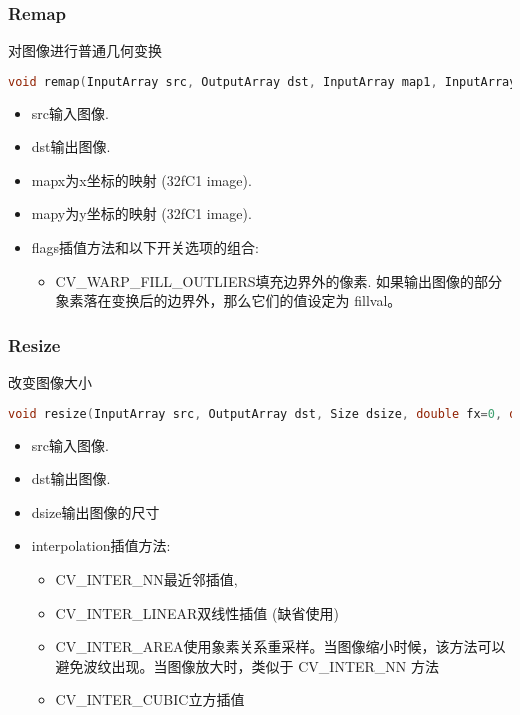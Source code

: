\documentclass[12pt]{article}
\begin{document}
\subsubsection{Remap}
对图像进行普通几何变换
\begin{lstlisting}[language=c++]
void remap(InputArray src, OutputArray dst, InputArray map1, InputArray map2, int interpolation, int borderMode=BORDER_CONSTANT, const Scalar& borderValue=Scalar())
\end{lstlisting}
\begin{itemize}
\item src输入图像. 
\item dst输出图像. 
\item mapx为x坐标的映射 (32fC1 image). 
\item mapy为y坐标的映射 (32fC1 image). 
\item flags插值方法和以下开关选项的组合:
	\begin{itemize}
	\item CV\_WARP\_FILL\_OUTLIERS填充边界外的像素. 如果输出图像的部分象素落在变换后的边界外，那么它们的值设定为 fillval。
	\end{itemize}
\end{itemize}

\subsubsection{Resize}
改变图像大小
\begin{lstlisting}[language=c++]
void resize(InputArray src, OutputArray dst, Size dsize, double fx=0, double fy=0, int interpolation=INTER_LINEAR )
\end{lstlisting}
\begin{itemize}
\item src输入图像. 
\item dst输出图像. 
\item dsize输出图像的尺寸
\item interpolation插值方法:
	\begin{itemize}
	\item CV\_INTER\_NN最近邻插值,
	\item CV\_INTER\_LINEAR双线性插值 (缺省使用)
	\item CV\_INTER\_AREA使用象素关系重采样。当图像缩小时候，该方法可以避免波纹出现。当图像放大时，类似于 CV\_INTER\_NN 方法
	\item CV\_INTER\_CUBIC立方插值
	\end{itemize}
\end{itemize}
\end{document}
